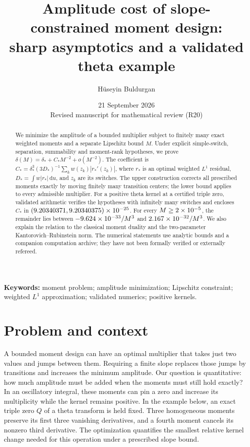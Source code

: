 \documentclass[11pt,a4paper]{article}
\title{Amplitude cost of slope-constrained moment design:\\
sharp asymptotics and a validated theta example}
\author{H\"useyin Buldurgan}
\date{21 September 2026\\\small Revised manuscript for mathematical review (R20)}
\numberwithin{equation}{section}
\theoremstyle{remark}\newtheorem{remark}[theorem]{Remark}
\newcommand{\dd}{\,\mathrm du}
\newcommand{\ds}{\delta_*}
\newcommand{\Ds}{D_*}
\newcommand{\Cs}{C_*}
\newcommand{\rs}{r_*}
\begin{document}
\maketitle
\begin{abstract}
We minimize the amplitude of a bounded multiplier subject to finitely many
exact weighted moments and a separate Lipschitz bound $M$. Under explicit
simple-switch, separation, summability and moment-rank hypotheses, we prove
$\delta(M)=\ds+\Cs M^{-2}+o(M^{-2})$. The coefficient is
$\Cs=\ds^3(3\Ds)^{-1}\sum_k w(z_k)|\rs'(z_k)|$, where $\rs$ is an optimal
weighted $L^1$ residual, $\Ds=\int w|\rs|\dd$, and $z_k$ are its switches.
The upper construction corrects all prescribed moments exactly by moving
finitely many transition centers; the lower bound applies to every
admissible multiplier. For a positive theta kernel at a certified triple
zero, validated arithmetic verifies the hypotheses with infinitely many
switches and encloses $\Cs$ in
$(9.20340371,9.20340375)\times10^{-25}$. For every $M\ge2\times10^{-5}$, the remainder
lies between $-9.624\times10^{-33}/M^3$ and $2.167\times10^{-32}/M^3$. We also explain the relation
to the classical moment duality and the two-parameter Kantorovich--Rubinstein
norm. The numerical statements use analytic bounds and a companion
computation archive; they have not been formally verified or externally refereed.
\end{abstract}
\noindent\textbf{Keywords:} moment problem; amplitude minimization; Lipschitz
constraint; weighted $L^1$ approximation; validated numerics; positive kernels.

\section{Problem and context}\label{sec:intro}
A bounded moment design can have an optimal multiplier that takes just two
values and jumps between them. Requiring a finite slope replaces those
jumps by transitions and increases the minimum amplitude. Our question is
quantitative: how much amplitude must be added when the moments must still
hold exactly? In an oscillatory integral, these moments can pin a zero and
increase its multiplicity while the kernel remains positive.
In the example below, an exact triple zero $Q$ of a theta transform is
held fixed. Three homogeneous moments preserve its first three vanishing
derivatives, and a fourth moment cancels its nonzero third derivative.
The optimization quantifies the smallest relative kernel change needed
for this operation under a prescribed slope bound.
\end{document}
